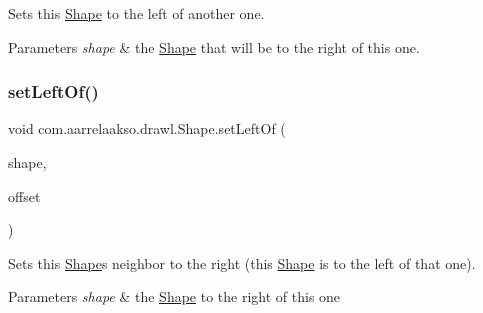 Sets this \hyperlink{classcom_1_1aarrelaakso_1_1drawl_1_1_shape}{Shape} to the left of another one. 


\begin{DoxyParams}{Parameters}
{\em shape} & the \hyperlink{classcom_1_1aarrelaakso_1_1drawl_1_1_shape}{Shape} that will be to the right of this one. \\
\hline
\end{DoxyParams}
\mbox{\label{classcom_1_1aarrelaakso_1_1drawl_1_1_shape_a8012a3823982d77b563ef61787ccb523}} 
\subsubsection{\texorpdfstring{set\+Left\+Of()}{setLeftOf()}\hspace{0.1cm}{\footnotesize\ttfamily [2/2]}}
{\footnotesize\ttfamily void com.\+aarrelaakso.\+drawl.\+Shape.\+set\+Left\+Of (\begin{DoxyParamCaption}\item[{@Not\+Null final \hyperlink{classcom_1_1aarrelaakso_1_1drawl_1_1_shape}{Shape}}]{shape,  }\item[{@Not\+Null final \hyperlink{classcom_1_1aarrelaakso_1_1drawl_1_1_measure}{Measure}}]{offset }\end{DoxyParamCaption})\hspace{0.3cm}{\ttfamily [inherited]}}



Sets this \hyperlink{classcom_1_1aarrelaakso_1_1drawl_1_1_shape}{Shape}\textquotesingle{}s neighbor to the right (this \hyperlink{classcom_1_1aarrelaakso_1_1drawl_1_1_shape}{Shape} is to the left of that one). 


\begin{DoxyParams}{Parameters}
{\em shape} & the \hyperlink{classcom_1_1aarrelaakso_1_1drawl_1_1_shape}{Shape} to the right of this one \\
\hline
\end{DoxyParams}
\mbox{\label{classcom_1_1aarrelaakso_1_1drawl_1_1_shape_a3cada5e03bd1552a79702d2945c7ed01}} 
